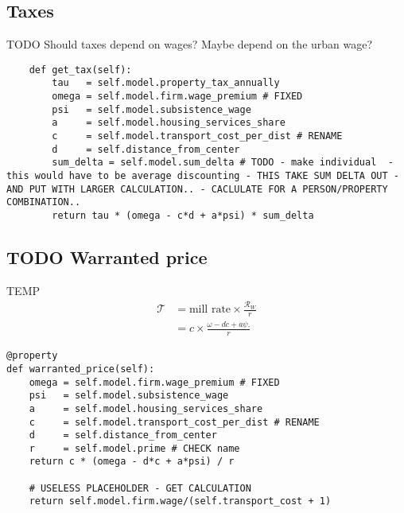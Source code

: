 \subsection{Taxes}
TODO Should taxes depend on wages? Maybe depend on the urban wage?


        
\begin{lstlisting}
    def get_tax(self):
        tau   = self.model.property_tax_annually
        omega = self.model.firm.wage_premium # FIXED
        psi   = self.model.subsistence_wage
        a     = self.model.housing_services_share
        c     = self.model.transport_cost_per_dist # RENAME
        d     = self.distance_from_center
        sum_delta = self.model.sum_delta # TODO - make individual  - this would have to be average discounting - THIS TAKE SUM DELTA OUT - AND PUT WITH LARGER CALCULATION.. - CACLULATE FOR A PERSON/PROPERTY COMBINATION..
        return tau * (omega - c*d + a*psi) * sum_delta
\end{lstlisting}


\subsection{TODO Warranted price}

TEMP
\begin{align*}
\mathcal{T} &= \text{mill rate} \times \frac{\mathcal{R}_W}{r} \\
&= c \times \frac{\omega- {dc} + a\psi.}{r}
\end{align*}

\begin{lstlisting}
@property
def warranted_price(self):
    omega = self.model.firm.wage_premium # FIXED
    psi   = self.model.subsistence_wage
    a     = self.model.housing_services_share
    c     = self.model.transport_cost_per_dist # RENAME
    d     = self.distance_from_center
    r     = self.model.prime # CHECK name
    return c * (omega - d*c + a*psi) / r
    
    # USELESS PLACEHOLDER - GET CALCULATION
    return self.model.firm.wage/(self.transport_cost + 1) 
\end{lstlisting}


